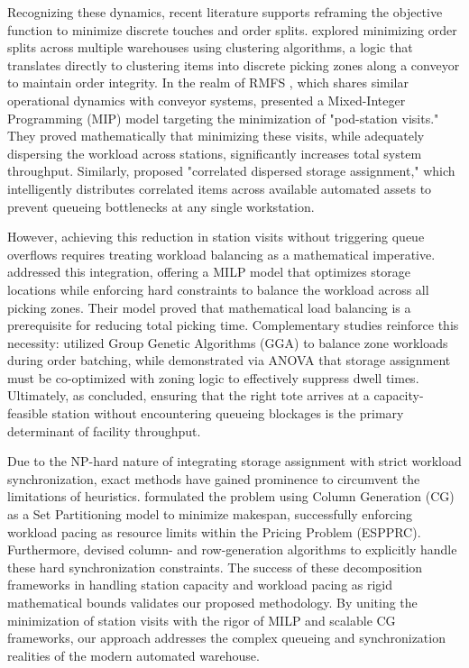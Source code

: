 \documentclass[preprint,review,11pt,authoryear]{elsarticle}
\begin{document}
Recognizing these dynamics, recent literature supports reframing the objective function to minimize discrete touches and order splits. \cite{zhu2021} explored minimizing order splits across multiple warehouses using clustering algorithms, a logic that translates directly to clustering items into discrete picking zones along a conveyor to maintain order integrity. In the realm of RMFS \cite{azadeh2019}, which shares similar operational dynamics with conveyor systems, \cite{xie2021} presented a Mixed-Integer Programming (MIP) model targeting the minimization of "pod-station visits." They proved mathematically that minimizing these visits, while adequately dispersing the workload across stations, significantly increases total system throughput. Similarly, \cite{mirzaei2021} proposed "correlated dispersed storage assignment," which intelligently distributes correlated items across available automated assets to prevent queueing bottlenecks at any single workstation.

However, achieving this reduction in station visits without triggering queue overflows requires treating workload balancing as a mathematical imperative. \cite{tarczynski2023} addressed this integration, offering a MILP model that optimizes storage locations while enforcing hard constraints to balance the workload across all picking zones. Their model proved that mathematical load balancing is a prerequisite for reducing total picking time. Complementary studies reinforce this necessity: \cite{pan2015} utilized Group Genetic Algorithms (GGA) to balance zone workloads during order batching, while \cite{vanGils2018} demonstrated via ANOVA that storage assignment must be co-optimized with zoning logic to effectively suppress dwell times. Ultimately, as \cite{boysen2023} concluded, ensuring that the right tote arrives at a capacity-feasible station without encountering queueing blockages is the primary determinant of facility throughput.

Due to the NP-hard nature of integrating storage assignment with strict workload synchronization, exact methods have gained prominence to circumvent the limitations of heuristics. \cite{muter2022} formulated the problem using Column Generation (CG) as a Set Partitioning model to minimize makespan, successfully enforcing workload pacing as resource limits within the Pricing Problem (ESPPRC). Furthermore, \cite{zhen2025} devised column- and row-generation algorithms to explicitly handle these hard synchronization constraints. The success of these decomposition frameworks in handling station capacity and workload pacing as rigid mathematical bounds validates our proposed methodology. By uniting the minimization of station visits with the rigor of MILP and scalable CG frameworks, our approach addresses the complex queueing and synchronization realities of the modern automated warehouse. 
\end{document}
